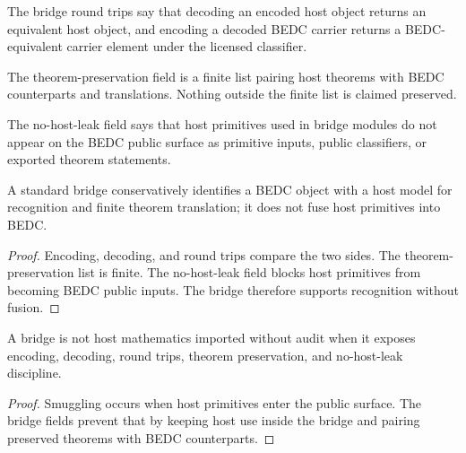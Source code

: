 \begin{definition}
\label{def:philosophy-standard-bridge-round-trips}
The bridge round trips say that decoding an encoded host object returns
an equivalent host object, and encoding a decoded BEDC carrier returns
a BEDC-equivalent carrier element under the licensed classifier.
\end{definition}

\begin{definition}
\label{def:philosophy-standard-bridge-theorem-preservation}
The theorem-preservation field is a finite list pairing host theorems
with BEDC counterparts and translations. Nothing outside the finite
list is claimed preserved.
\end{definition}

\begin{definition}
\label{def:philosophy-no-host-leak}
The no-host-leak field says that host primitives used in bridge
modules do not appear on the BEDC public surface as primitive inputs,
public classifiers, or exported theorem statements.
\end{definition}

\begin{theorem}
\label{thm:philosophy-standard-bridge-recognition-not-fusion}
A standard bridge conservatively identifies a BEDC object with a host
model for recognition and finite theorem translation; it does not fuse
host primitives into BEDC.
\end{theorem}
\begin{proof}
Encoding, decoding, and round trips compare the two sides. The
theorem-preservation list is finite. The no-host-leak field blocks
host primitives from becoming BEDC public inputs. The bridge therefore
supports recognition without fusion.
\end{proof}

\begin{corollary}
\label{cor:philosophy-bridge-not-smuggling}
A bridge is not host mathematics imported without audit when it exposes
encoding, decoding, round trips, theorem preservation, and no-host-leak
discipline.
\end{corollary}
\begin{proof}
Smuggling occurs when host primitives enter the public surface. The
bridge fields prevent that by keeping host use inside the bridge and
pairing preserved theorems with BEDC counterparts.
\end{proof}

